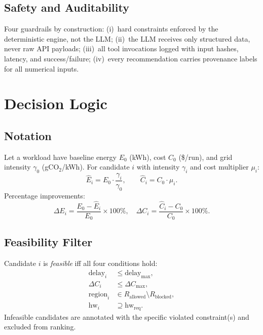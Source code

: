 ﻿\documentclass[conference]{IEEEtran}
\begin{document}
\subsection{Safety and Auditability}

Four guardrails by construction:
(i)~hard constraints enforced by the deterministic engine, not the LLM;
(ii)~the LLM receives only structured data, never raw API payloads;
(iii)~all tool invocations logged with input hashes, latency, and success/failure;
(iv)~every recommendation carries provenance labels for all numerical inputs.

\section{Decision Logic}

\subsection{Notation}

Let a workload have baseline energy $E_0$ (kWh), cost $C_0$ (\$/run), and grid
intensity $\gamma_0$ (gCO$_2$/kWh). For candidate $i$ with intensity $\gamma_i$
and cost multiplier $\mu_i$:
\begin{equation}
\hat{E}_i = E_0 \cdot \frac{\gamma_i}{\gamma_0}, \qquad \hat{C}_i = C_0 \cdot \mu_i.
\end{equation}
Percentage improvements:
\begin{equation}
\Delta E_i = \frac{E_0 - \hat{E}_i}{E_0} \times 100\%,\quad
\Delta C_i = \frac{\hat{C}_i - C_0}{C_0} \times 100\%.
\end{equation}

\subsection{Feasibility Filter}

Candidate $i$ is \emph{feasible} iff all four conditions hold:
\begin{align}
\text{delay}_i  &\leq \text{delay}_{\max},           \label{eq:c1}\\
\Delta C_i      &\leq \Delta C_{\max},                \label{eq:c2}\\
\text{region}_i &\in R_{\text{allowed}} \setminus R_{\text{blocked}},\label{eq:c3}\\
\text{hw}_i     &\supseteq \text{hw}_{\text{req}}.   \label{eq:c4}
\end{align}
Infeasible candidates are annotated with the specific violated constraint(s) and
excluded from ranking.
\end{document}
